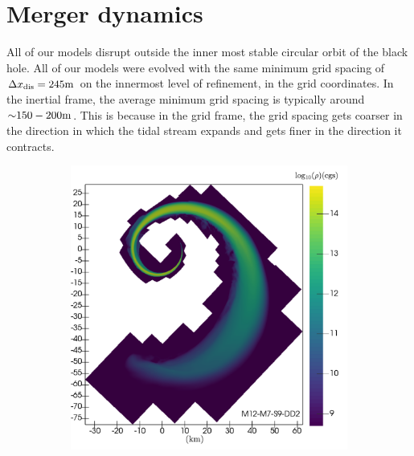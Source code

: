 \section{Merger dynamics}
\label{sec:merger-dynamics}

All of our models disrupt outside the inner most stable circular orbit of the black hole.  All of our models were evolved with the same minimum grid spacing of $\Delta x_{\rm dis} = 245{\rm m}$ on the innermost level of refinement, in the grid coordinates.  In the inertial frame, the average minimum grid spacing is typically around $\mathord{\sim} 150-200 {\rm m}$.  This is because in the grid frame, the grid spacing gets coarser in the direction in which the tidal stream expands and gets finer in the direction it contracts.


\begin{figure}
	\centering
	\begin{subfigure}[b]{0.475\textwidth}
		\centering
		\includegraphics[width=1.0\linewidth]{images/rho_DD2_M12-merger-inertial}
		\label{fig:rho_M12_DD2}
	\end{subfigure}
	\begin{subfigure}[b]{0.475\textwidth}
		\centering

\end{subfigure}
\end{figure}
